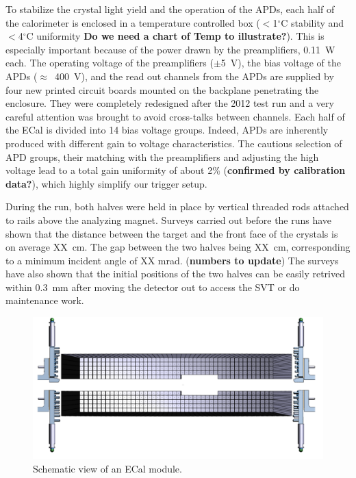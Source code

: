 \documentclass[review]{elsarticle}
\begin{document}
To stabilize the crystal light yield and the operation of the APDs, each half of the calorimeter is enclosed in a temperature 
controlled box ($<$1$^{\circ}$C stability and $<$4$^{\circ}$C uniformity
{\bf Do we need a chart of Temp to illustrate?}). This is 
especially important because of the power drawn by the 
preamplifiers, 0.11~W each. The operating voltage of the preamplifiers ($\pm$5~V), 
the bias voltage of the APDs ($\approx$~400~V), and the read out channels from the 
APDs are supplied by four new printed circuit boards mounted on the backplane penetrating the enclosure. They were completely redesigned after the 2012 
test run and a very careful attention was brought to avoid cross-talks 
between channels. Each half of the ECal is divided into 14 bias voltage 
groups. Indeed, APDs are inherently produced with different gain to voltage
characteristics. The cautious selection of APD groups, their matching with 
the preamplifiers and adjusting the high voltage lead to a total gain 
uniformity of about 2\% ({\bf confirmed by calibration data?}), which 
highly simplify our trigger setup.

During the run, both halves were held in place by vertical threaded rods 
attached to rails above the analyzing magnet. Surveys carried out before 
the runs have shown that the distance between the target and the front 
face of the crystals is on average XX~cm. The gap between the two halves 
being XX~cm, corresponding to a minimum incident angle of XX mrad. 
({\bf numbers to update}) The surveys have also shown that the initial
positions of the two halves can be easily retrived within 0.3~mm after
moving the detector out to access the SVT or do maintenance work.

\begin{figure}[ht!]
\centering
\includegraphics[width=1.00\textwidth]{ViewCalo.png}
\caption{Schematic view of an ECal module.}
\label{Calo}
\end{figure}
\end{document}
